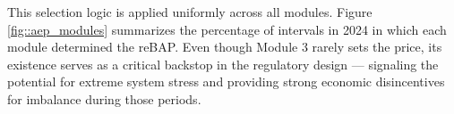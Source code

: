 \documentclass[class=scrbook, crop=false]{standalone}
\begin{document}
This selection logic is applied uniformly across all modules. Figure \ref{fig::aep_modules} summarizes the percentage of intervals in 2024 in which each module determined the reBAP.
Even though Module 3 rarely sets the price, its existence serves as a critical backstop in the regulatory design — signaling the potential for extreme system stress and providing strong economic disincentives for imbalance during those periods.






\ifstandalone
    \printbibliography[heading=bibintoc]                         \cleardoublepage




\fi
\end{document}
